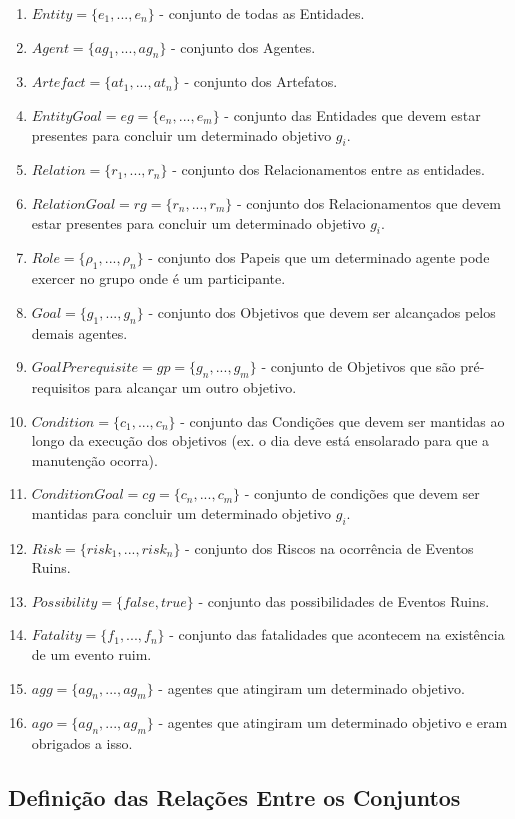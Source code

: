 \documentclass[12pt]{article}
\begin{document}
\begin{enumerate}
	\item $Entity = \{e_1, ..., e_n\}$ - conjunto de todas as Entidades.  
	\item $Agent = \{ag_1, ..., ag_n\}$ - conjunto dos Agentes.
	\item $Artefact = \{at_1, ..., at_n\}$ - conjunto dos Artefatos.
	\item $EntityGoal = eg = \{e_n,...,e_m\}$ - conjunto das Entidades que devem estar presentes para concluir um determinado objetivo $g_i$.
	\item $Relation = \{r_1, ..., r_n\}$ - conjunto dos Relacionamentos entre as entidades.	
	\item $RelationGoal = rg =\{r_n, ..., r_m\}$ - conjunto dos Relacionamentos que devem estar presentes para concluir um determinado objetivo $g_i$.		
	\item $Role = \{\rho_1, ..., \rho_n\}$ - conjunto dos Papeis que um determinado agente pode exercer no grupo onde é um participante.	
	\item $Goal = \{g_1, ..., g_n\}$ - conjunto dos Objetivos que devem ser alcançados pelos demais agentes.
	\item $GoalPrerequisite = gp = \{g_n,...,g_m\}$ - conjunto de Objetivos que são pré-requisitos para alcançar um outro objetivo.
	\item $Condition = \{c_1, ..., c_n\}$ - conjunto das Condições que devem ser mantidas ao longo da execução dos objetivos (ex. o dia deve está ensolarado para que a manutenção ocorra).
	\item $ConditionGoal = cg = \{c_n, ..., c_m\}$ - conjunto de condições que devem ser mantidas para concluir um determinado objetivo $g_i$.
	\item $Risk = \{risk_1, ..., risk_n\}$ - conjunto dos Riscos na ocorrência de Eventos Ruins.
	\item $Possibility = \{false,true\}$ - conjunto das possibilidades de Eventos Ruins. 
	\item $Fatality = \{f_1, ..., f_n\}$ - conjunto das fatalidades que acontecem na existência de um evento ruim. 	
	\item $agg = \{ag_n,...,ag_m\}$ - agentes que atingiram um determinado objetivo. 
	\item $ago = \{ag_n,...,ag_m\}$ - agentes que atingiram um determinado objetivo e eram obrigados a isso. 
\end{enumerate}


\subsection{Definição das Relações Entre os Conjuntos}
\end{document}

